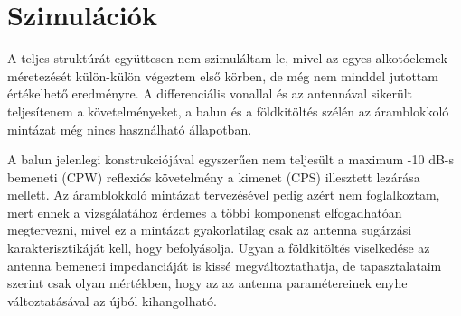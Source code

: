 \chapter{Szimulációk}
A teljes struktúrát együttesen nem szimuláltam le, mivel az egyes alkotóelemek méretezését külön-külön végeztem első körben, de még nem minddel jutottam értékelhető eredményre. A differenciális vonallal és az antennával sikerült teljesítenem a követelményeket, a balun és a földkitöltés szélén az áramblokkoló mintázat még nincs használható állapotban.
\par A balun jelenlegi konstrukciójával egyszerűen nem teljesült a maximum -10 dB-s bemeneti (CPW) reflexiós követelmény a kimenet (CPS) illesztett lezárása mellett. Az áramblokkoló mintázat tervezésével pedig azért nem foglalkoztam, mert ennek a vizsgálatához érdemes a többi komponenst elfogadhatóan megtervezni, mivel ez a mintázat gyakorlatilag csak az antenna sugárzási karakterisztikáját kell, hogy befolyásolja. Ugyan a földkitöltés viselkedése az antenna bemeneti impedanciáját is kissé megváltoztathatja, de tapasztalataim szerint csak olyan mértékben, hogy az az antenna paramétereinek enyhe változtatásával az újból kihangolható.
